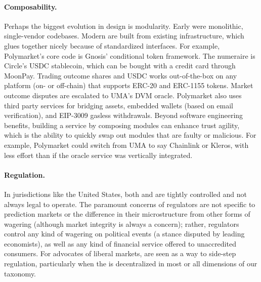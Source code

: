 \paragraph{Composability.} Perhaps the biggest evolution in \depm design is modularity. Early \depms were monolithic, single-vendor codebases. Modern \depms are built from existing infrastructure, which glues together nicely because of standardized interfaces. For example, Polymarket's core \depm code is Gnosis' conditional token framework. The numeraire is Circle's USDC stablecoin, which can be bought with a credit card through MoonPay. Trading outcome shares and USDC works out-of-the-box on any platform (on- or off-chain) that supports ERC-20 and ERC-1155 tokens. Market outcome disputes are escalated to UMA's DVM oracle. Polymarket also uses third party services for bridging assets, embedded wallets (based on email verification), and EIP-3009 gasless withdrawals. Beyond software engineering benefits, building a service by composing modules can enhance trust agility, which is the ability to quickly swap out modules that are faulty or malicious. For example, Polymarket could switch from UMA to say Chainlink or Kleros, with less effort than if the oracle service was vertically integrated. 



\paragraph{Regulation.} In jurisdictions like the United States, both \cepms and \depms are tightly controlled and not always legal to operate. The paramount concerns of regulators are not specific to prediction markets or the difference in their microstructure from other forms of wagering (although market integrity is always a concern); rather, regulators control any kind of wagering on political events (a stance disputed by leading economists), as well as any kind of financial service offered to unaccredited consumers. For advocates of liberal markets, \depms are seen as a way to side-step regulation, particularly when the \depm is decentralized in most or all dimensions of our taxonomy. 




